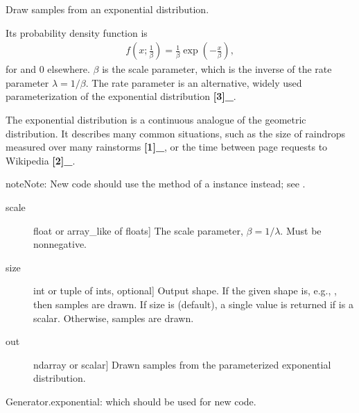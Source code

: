 \documentclass[letterpaper,10pt,english]{sphinxmanual}
\begin{document}

\begin{fulllineitems}
\label{\detokenize{infrapy.utils:infrapy.utils.ref2sac.exponential}}
Draw samples from an exponential distribution.

Its probability density function is
\begin{equation*}
\begin{split}f(x; \frac{1}{\beta}) = \frac{1}{\beta} \exp(-\frac{x}{\beta}),\end{split}
\end{equation*}
for  and 0 elsewhere. \(\beta\) is the scale parameter,
which is the inverse of the rate parameter \(\lambda = 1/\beta\).
The rate parameter is an alternative, widely used parameterization
of the exponential distribution {\color{red}\bfseries{}{[}3{]}\_}.

The exponential distribution is a continuous analogue of the
geometric distribution.  It describes many common situations, such as
the size of raindrops measured over many rainstorms {\color{red}\bfseries{}{[}1{]}\_}, or the time
between page requests to Wikipedia {\color{red}\bfseries{}{[}2{]}\_}.

\begin{sphinxadmonition}{note}{Note:}
New code should use the  method of a 
instance instead; see .
\end{sphinxadmonition}
\begin{description}
\item[{scale}] \leavevmode{[}float or array\_like of floats{]}
The scale parameter, \(\beta = 1/\lambda\). Must be
non\sphinxhyphen{}negative.

\item[{size}] \leavevmode{[}int or tuple of ints, optional{]}
Output shape.  If the given shape is, e.g., , then
 samples are drawn.  If size is  (default),
a single value is returned if  is a scalar.  Otherwise,
 samples are drawn.

\end{description}
\begin{description}
\item[{out}] \leavevmode{[}ndarray or scalar{]}
Drawn samples from the parameterized exponential distribution.

\end{description}

Generator.exponential: which should be used for new code.

\end{fulllineitems}
\end{document}
